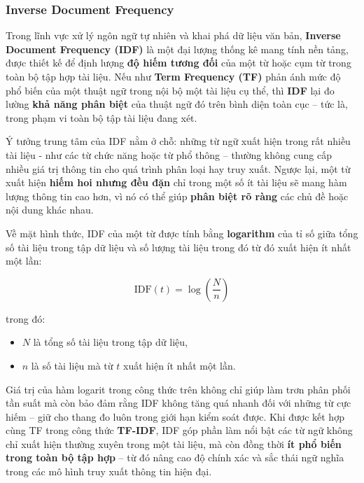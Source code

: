 \subsubsection{Inverse Document Frequency}
Trong lĩnh vực xử lý ngôn ngữ tự nhiên và khai phá dữ liệu văn bản, \textbf{Inverse Document Frequency (IDF)} là một đại lượng thống kê mang tính nền tảng, được thiết kế để định lượng \textbf{độ hiếm tương đối} của một từ hoặc cụm từ trong toàn bộ tập hợp tài liệu. Nếu như \textbf{Term Frequency (TF)} phản ánh mức độ phổ biến của một thuật ngữ trong nội bộ một tài liệu cụ thể, thì \textbf{IDF} lại đo lường \textbf{khả năng phân biệt} của thuật ngữ đó trên bình diện toàn cục -- tức là, trong phạm vi toàn bộ tập tài liệu đang xét.

Ý tưởng trung tâm của IDF nằm ở chỗ: những từ ngữ xuất hiện trong rất nhiều tài liệu - như các từ chức năng hoặc từ phổ thông -- thường không cung cấp nhiều giá trị thông tin cho quá trình phân loại hay truy xuất. Ngược lại, một từ xuất hiện \textbf{hiếm hoi nhưng đều đặn} chỉ trong một số ít tài liệu sẽ mang hàm lượng thông tin cao hơn, vì nó có thể giúp \textbf{phân biệt rõ ràng} các chủ đề hoặc nội dung khác nhau.

Về mặt hình thức, IDF của một từ được tính bằng \textbf{logarithm} của tỉ số giữa tổng số tài liệu trong tập dữ liệu và số lượng tài liệu trong đó từ đó xuất hiện ít nhất một lần:

\begin{equation}
    \text{IDF}(t) = \log \left( \frac{N}{n} \right)
\end{equation}

trong đó:

\begin{itemize}
    \item \(N\) là tổng số tài liệu trong tập dữ liệu,
    \item \(n\) là số tài liệu mà từ \(t\) xuất hiện ít nhất một lần.
\end{itemize}

Giá trị của hàm logarit trong công thức trên không chỉ giúp làm trơn phân phối tần suất mà còn bảo đảm rằng IDF không tăng quá nhanh đối với những từ cực hiếm -- giữ cho thang đo luôn trong giới hạn kiểm soát được. Khi được kết hợp cùng TF trong công thức \textbf{TF-IDF}, IDF góp phần làm nổi bật các từ ngữ không chỉ xuất hiện thường xuyên trong một tài liệu, mà còn đồng thời \textbf{ít phổ biến trong toàn bộ tập hợp} -- từ đó nâng cao độ chính xác và sắc thái ngữ nghĩa trong các mô hình truy xuất thông tin hiện đại.
